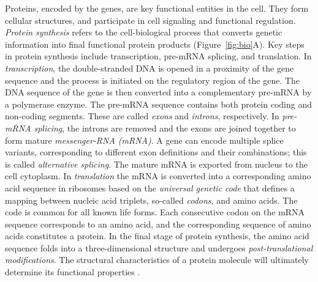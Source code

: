 Proteins, encoded by the genes, are key functional entities in the
cell. They form cellular structures, and participate in cell signaling
and functional regulation. {\it Protein synthesis} refers to the
cell-biological process that converts genetic information into final
functional protein products (Figure~\ref{fig:bio}A). Key steps in
protein synthesis include transcription, pre-mRNA splicing, and
translation. In {\it transcription}, the double-stranded DNA is opened
in a proximity of the gene sequence and the process is initiated on
the regulatory region of the gene. The DNA sequence of the gene is
then converted into a complementary pre-mRNA by a polymerase
enzyme. The pre-mRNA sequence contains both protein coding and
non-coding segments. These are called {\it exons} and {\it introns},
respectively. In {\it pre-mRNA splicing}, the introns are removed and
the exons are joined together to form mature {\it messenger-RNA
  (mRNA)}. A gene can encode multiple splice variants, corresponding
to different exon definitions and their combinations; this is called
{\it alternative splicing}. The mature mRNA is exported from nucleus
to the cell cytoplasm. In {\it translation} the mRNA is converted into
a corresponding amino acid sequence in ribosomes based on the {\it
  universal genetic code} that defines a mapping between nucleic acid
triplets, so-called {\it codons}, and amino acids. The code is common
for all known life forms. Each consecutive codon on the mRNA sequence
corresponds to an amino acid, and the corresponding sequence of amino
acids constitutes a protein. In the final stage of protein synthesis,
the amino acid sequence folds into a three-dimensional structure and
undergoes {\it post-translational modifications}. The structural
characteristics of a protein molecule will ultimately determine its
functional properties \citep{Alberts02}.

